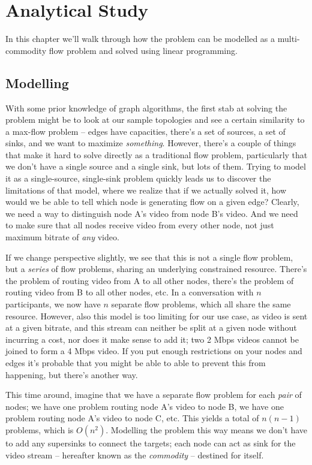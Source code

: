 \chapter{Analytical Study}
\label{chp:suggested-solution}

In this chapter we'll walk through how the problem can be modelled as a multi-commodity flow problem and solved using linear programming.


\section{Modelling}

With some prior knowledge of graph algorithms, the first stab at solving the problem might be to look at our sample topologies and see a certain similarity to a max-flow problem -- edges have capacities, there's a set of sources, a set of sinks, and we want to maximize \emph{something}. However, there's a couple of things that make it hard to solve directly as a traditional flow problem, particularly that we don't have a single source and a single sink, but lots of them. Trying to model it as a single-source, single-sink problem quickly leads us to discover the limitations of that model, where we realize that if we actually solved it, how would we be able to tell which node is generating flow on a given edge? Clearly, we need a way to distinguish node A's video from node B's video. And we need to make sure that all nodes receive video from every other node, not just maximum bitrate of \emph{any} video.

If we change perspective slightly, we see that this is not a single flow problem, but a \emph{series} of flow problems, sharing an underlying constrained resource. There's the problem of routing video from A to all other nodes, there's the problem of routing video from B to all other nodes, etc. In a conversation with $n$ participants, we now have $n$ separate flow problems, which all share the same resource. However, also this model is too limiting for our use case, as video is sent at a given bitrate, and this stream can neither be split at a given node without incurring a cost, nor does it make sense to add it; two 2 Mbps videos cannot be joined to form a 4 Mbps video. If you put enough restrictions on your nodes and edges it's probable that you might be able to able to prevent this from happening, but there's another way.

This time around, imagine that we have a separate flow problem for each \emph{pair} of nodes; we have one problem routing node A's video to node B, we have one problem routing node A's video to node C, etc. This yields a total of $n(n-1)$ problems, which is $O(n^2)$. Modelling the problem this way means we don't have to add any supersinks to connect the targets; each node can act as sink for the video stream -- hereafter known as the \emph{commodity} -- destined for itself.

